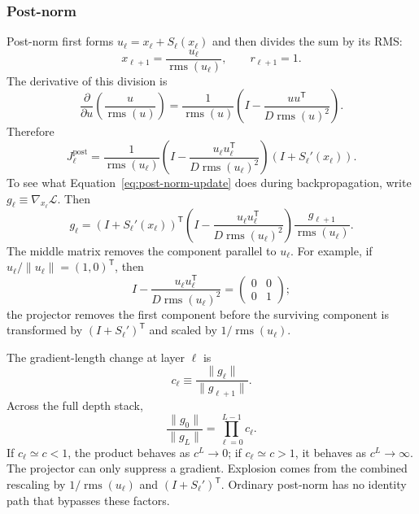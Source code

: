 \documentclass[11pt]{article}
\begin{document}
\subsubsection*{Post-norm}
Post-norm first forms $u_\ell=x_\ell+S_\ell(x_\ell)$ and then divides the sum
by its RMS:
\begin{equation}
  x_{\ell+1}=\frac{u_\ell}{\operatorname{rms}(u_\ell)},
  \qquad r_{\ell+1}=1.
  \label{eq:post-norm-update}
\end{equation}
The derivative of this division is
\begin{equation}
  \frac{\partial}{\partial u}
  \left(\frac{u}{\operatorname{rms}(u)}\right)
  =\frac{1}{\operatorname{rms}(u)}
  \left(I-\frac{uu^{\mathsf T}}
                 {D\operatorname{rms}(u)^2}\right).
\end{equation}
Therefore
\begin{equation}
  J_\ell^{\mathrm{post}}
  =\frac{1}{\operatorname{rms}(u_\ell)}
  \left(I-\frac{u_\ell u_\ell^{\mathsf T}}
                 {D\operatorname{rms}(u_\ell)^2}\right)
  \left(I+S_\ell'(x_\ell)\right).
\end{equation}
To see what Equation~\eqref{eq:post-norm-update} does during backpropagation, write
$g_\ell\equiv\nabla_{x_\ell}\mathcal{L}$.  Then
\[
  g_\ell
  =\left(I+S_\ell'(x_\ell)\right)^{\mathsf T}
   \left(I-\frac{u_\ell u_\ell^{\mathsf T}}
                    {D\operatorname{rms}(u_\ell)^2}\right)
   \frac{g_{\ell+1}}{\operatorname{rms}(u_\ell)}.
\]
The middle matrix removes the component parallel to $u_\ell$.  For example,
if $u_\ell/\lVert u_\ell\rVert=(1,0)^{\mathsf T}$, then
\[
  I-\frac{u_\ell u_\ell^{\mathsf T}}
          {D\operatorname{rms}(u_\ell)^2}
  =\begin{pmatrix}0&0\\0&1\end{pmatrix};
\]
the projector removes the first component before the surviving component is
transformed by $\left(I+S_\ell'\right)^{\mathsf T}$ and scaled by
$1/\operatorname{rms}(u_\ell)$.

The gradient-length change at layer $\ell$ is
\[
  c_\ell\equiv\frac{\lVert g_\ell\rVert}
                         {\lVert g_{\ell+1}\rVert}.
\]
Across the full depth stack,
\[
  \frac{\lVert g_0\rVert}{\lVert g_L\rVert}
  =\prod_{\ell=0}^{L-1}c_\ell.
\]
If $c_\ell\simeq c<1$, the product behaves as $c^L\to0$; if
$c_\ell\simeq c>1$, it behaves as $c^L\to\infty$.  The projector can only
suppress a gradient.  Explosion comes from the combined rescaling by
$1/\operatorname{rms}(u_\ell)$ and
$\left(I+S_\ell'\right)^{\mathsf T}$.  Ordinary
post-norm has no identity path that bypasses these factors.
\end{document}
